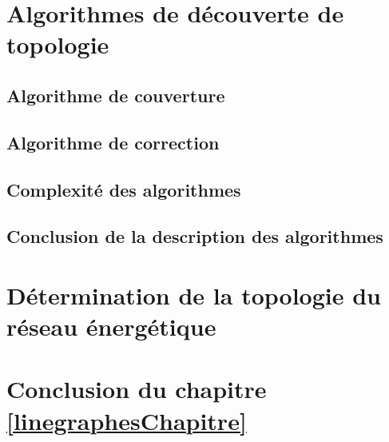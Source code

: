 \section{Algorithmes de d\'ecouverte de topologie}

	
	
	\subsection{Algorithme de couverture}
		\label{algoCouverture}
		
		
	\subsection{Algorithme de correction}
		

	\subsection{Complexit\'e des algorithmes}
		

	\subsection{Conclusion de la description des algorithmes}
		

\section{D\'etermination de la topologie du r\'eseau \'energ\'etique}
	
		
\section{Conclusion du chapitre \ref{linegraphesChapitre} }
	 
